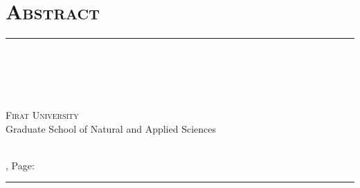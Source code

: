 \chapter*{\Large \bfseries\scshape Abstract}
\vspace{-0.6cm}
\hfill\rule{\textwidth}{0.3pt}\par\vspace{-0.6cm}

\begin{singlespacing}

\begin{center}

\begin{large}
\tezbasligien\\\vspace{0.35cm}
\end{large}


\begin{small}
\textbf{\tezyazari}\\\vspace{0.25cm}
\dereceen\\\vspace{0.25cm}
\end{small}

\begin{footnotesize}
{\small\textsc{Firat University}\\Graduate School of Natural and Applied Sciences}\singlespacing

\abden\\


\ayen\: \yil , Page: \sayfasayisi \vspace{-0.35cm}
\end{footnotesize}

\hfill\rule{\textwidth}{0.3pt}\par

\end{center}
\end{singlespacing}


